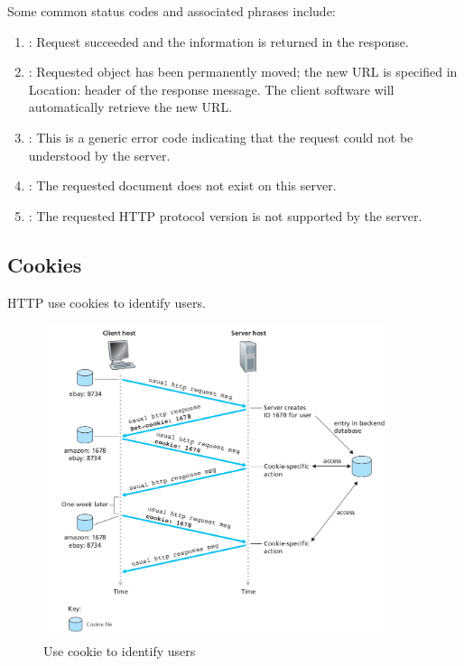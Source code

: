 Some common status codes and associated phrases include:
\begin{enumerate}
    \item {}: Request succeeded and the information is returned in the response.
    \item {}: Requested object has been permanently moved;
          the new URL is specified in Location: header of the response message. The
          client software will automatically retrieve the new URL.
    \item {}: This is a generic error code indicating that the request
          could not be understood by the server.
    \item {}: The requested document does not exist on this server.
    \item {}: The requested HTTP protocol
          version is not supported by the server.
\end{enumerate}


\subsection{Cookies}

\hf
HTTP use cookies to identify users.

\begin{figure}[!h]
    \centering
    \includegraphics[width=0.9\textwidth]{chapters/chapter2/UserState_cookie.png}
    \caption{Use cookie to identify users}
    \label{c2_cookies}
\end{figure}

